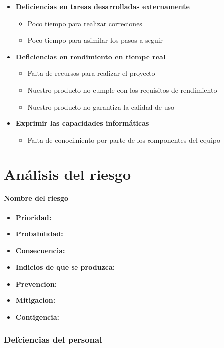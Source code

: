 \documentclass[spanish,a4paper,12pt]{report}	%
\begin{document}
\begin{itemize}
\begin{itemize}
	\end{itemize}
\item \textbf {Deficiencias en tareas desarrolladas externamente}
	\begin{itemize}
		\item {Poco tiempo para realizar correciones}
		\item {Poco tiempo para asimilar los pasos a seguir}
	\end{itemize}
\item \textbf {Deficiencias en rendimiento en tiempo real}
	\begin{itemize}
		\item {Falta de recursos para realizar el proyecto}
		\item {Nuestro producto no cumple con los requisitos de rendimiento}
		\item {Nuestro producto no garantiza la calidad de uso}
	\end{itemize}
\item \textbf {Exprimir las capacidades informáticas}
	\begin{itemize}
		\item {Falta de conocimiento por parte de los componentes del equipo}
	\end{itemize}
\end{itemize}



\part{Análisis del riesgo}

\subsection*{Nombre del riesgo}			%
	\begin{itemize}
		\item \textbf {Prioridad: }
		\item \textbf {Probabilidad: }
		\item \textbf {Consecuencia: }
		\item \textbf {Indicios de que se produzca: }
		\item \textbf {Prevencion: }
		\item \textbf {Mitigacion: }
		\item \textbf {Contigencia: }
	\end{itemize}


\section{Defciencias del personal}
%
\end{document}
